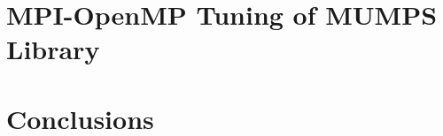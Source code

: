 





\section{MPI-OpenMP Tuning of MUMPS Library}
\label{subseq:mpi-openmp}


\section{Conclusions}
\label{subseq:conclusions}







